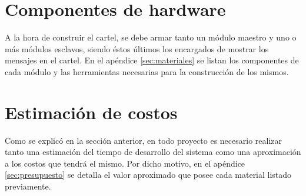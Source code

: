 \section{Componentes de hardware}
A la hora de construir el cartel, se debe armar tanto un módulo maestro y uno o más módulos esclavos, siendo éstos últimos los encargados de mostrar los mensajes en el cartel.
En el apéndice \ref{sec:materiales} se listan los componentes de cada módulo y las herramientas necesarias para la construcción de los mismos.


\section{Estimación de costos}
Como se explicó en la sección anterior, en todo proyecto es necesario realizar tanto una estimación del tiempo de desarrollo del sistema como una aproximación a los costos que tendrá el mismo.
Por dicho motivo, en el apéndice \ref{sec:presupuesto} se detalla el valor aproximado que posee cada material listado previamente.